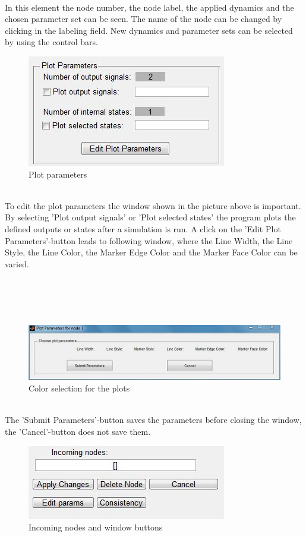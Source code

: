 \documentclass[12pt]{report}
\begin{document}
\\
In this element the node number, the node label, the applied dynamics and the chosen parameter set can be seen. The name of the node can be changed by clicking in the labeling field. New dynamics and parameter sets can be selected by using the control bars.\\
\begin{figure}[h]
\centering
\includegraphics[scale=.8]{plotparameters}
\caption{Plot parameters}
\label{FIG:abb26}
\end{figure}
\\
To edit the plot parameters the window shown in the picture above is important. By selecting 'Plot output signals' or 'Plot selected states' the program plots the defined outputs or states after a simulation is run. A click on the 'Edit Plot Parameters'-button leads to following window, where the Line Width, the Line Style, the Line Color, the Marker Edge Color and the Marker Face Color can be varied.\\
\\
\\
\\
\\
\begin{figure}[h]
\centering
\includegraphics[scale=.7]{editplot}
\caption{Color selection for the plots}
\label{FIG:abb27}
\end{figure}
\\
The 'Submit Parameters'-button saves the parameters before closing the window, the 'Cancel'-button does not save them.\\
\begin{figure}[h]
\centering
\includegraphics[scale=.8]{incomingnodes}
\caption{Incoming nodes and window buttons}
\label{FIG:abb28}
\end{figure}
\end{document}
